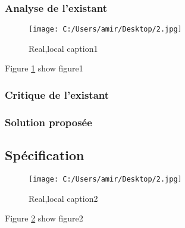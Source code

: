 \documentclass{article}
\begin{document}
\subsubsection{Analyse de l’existant}
\lipsum[1]
\begin{figure}[H]
\centering
\texttt{[image: C:/Users/amir/Desktop/2.jpg]}
\caption[Optional caption1]{Real,local caption1}
\label{fig:pic1}

\end{figure}
Figure \ref{fig:pic1} show figure1
\subsubsection{Critique de l’existant}
\lipsum[1] 
\subsubsection{ Solution proposée}
\lipsum[1]
\subsection{Spécification}
\lipsum[1]

\begin{figure}[H]
\centering
\texttt{[image: C:/Users/amir/Desktop/2.jpg]}
\caption[Optional caption2]{Real,local caption2}
\label{fig:pic2}

\end{figure}
Figure \ref{fig:pic2} show figure2

\cleardoublepage


\end{document}
